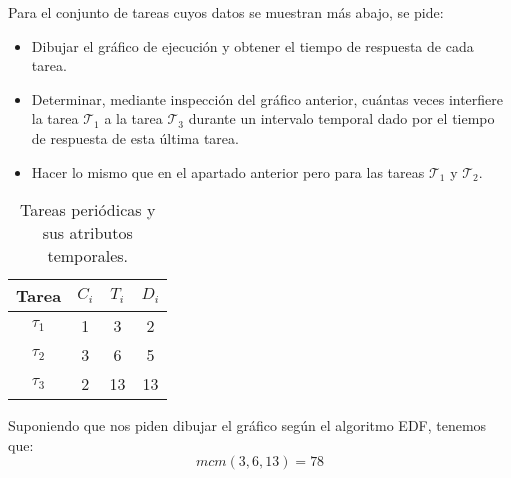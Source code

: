 \begin{ejercicio}\label{ej:rel4_8}
    Para el conjunto de tareas cuyos datos se muestran más abajo, se pide:
    \begin{itemize}
        \item Dibujar el gráfico de ejecución y obtener el tiempo de respuesta de cada tarea.
        \item Determinar, mediante inspección del gráfico anterior, cuántas veces interfiere la tarea $\mathcal{T}_1$ a la tarea $\mathcal{T}_3$ durante un intervalo temporal dado por el tiempo de respuesta de esta última tarea.
        \item Hacer lo mismo que en el apartado anterior pero para las tareas $\mathcal{T}_1$ y $\mathcal{T}_2$.
    \end{itemize}
    \begin{table}[H]
    \centering
    \begin{tabular}{|c|c|c|c|}
        \hline
        Tarea & $C_i$ & $T_i$ & $D_i$ \\
        \hline
        $\tau_1$ & 1 & 3 & 2 \\
        \hline
        $\tau_2$ & 3 & 6 & 5 \\
        \hline
        $\tau_3$ & 2 & 13 & 13 \\
        \hline
    \end{tabular}
    \caption{Tareas periódicas y sus atributos temporales.}
    \label{tab:4_8}
    \end{table}

    \noindent
    Suponiendo que nos piden dibujar el gráfico según el algoritmo EDF, tenemos que:
    \begin{equation*}
        mcm(3,6,13) = 78
    \end{equation*}
    \begin{figure}[H]
        \centering
\end{figure}
\end{ejercicio}
